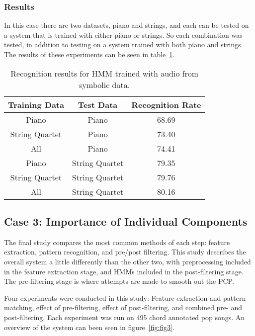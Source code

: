 \documentclass{sig-alternate}
\begin{document}
\subsubsection{Results}

In this case there are two datasets, piano and strings, and each can be tested on a system that is trained with either piano or strings. So each combination was tested, in addition to testing on a system trained with both piano and strings. The results of these experiments can be seen in table~\ref{tab:tab5}.

\begin{table}
\centering
\begin{tabular}{|c|c|c|} \hline
Training Data & Test Data & Recognition Rate \\ \hline
Piano & Piano & 68.69 \\ \hline
String Quartet & Piano & 73.40 \\ \hline
All & Piano & 74.41 \\ \hline
Piano & String Quartet & 79.35 \\ \hline
String Quartet & String Quartet & 79.76 \\ \hline
All & String Quartet & 80.16 \\ \hline
\end{tabular}
\caption{Recognition results for HMM trained with audio from symbolic data.}
\label{tab:tab5}
\end{table}

\subsection{Case 3: Importance of Individual Components}

The final study \cite{TaeMin:2014} compares the most common methods of each step: feature extraction, pattern recognition, and pre/post filtering. This study describes the overall system a little differently than the other two, with preprocessing included in the feature extraction stage, and HMMs included in the post-filtering stage. The pre-filtering stage is where attempts are made to smooth out the PCP. 

Four experiments were conducted in this study: Feature extraction and pattern matching, effect of pre-filtering, effect of post-filtering, and combined pre- and post-filtering. Each experiment was run on 495 chord annotated pop songs. An overview of the system can been seen in figure~\ref{fig:fig3}.

\end{document}
